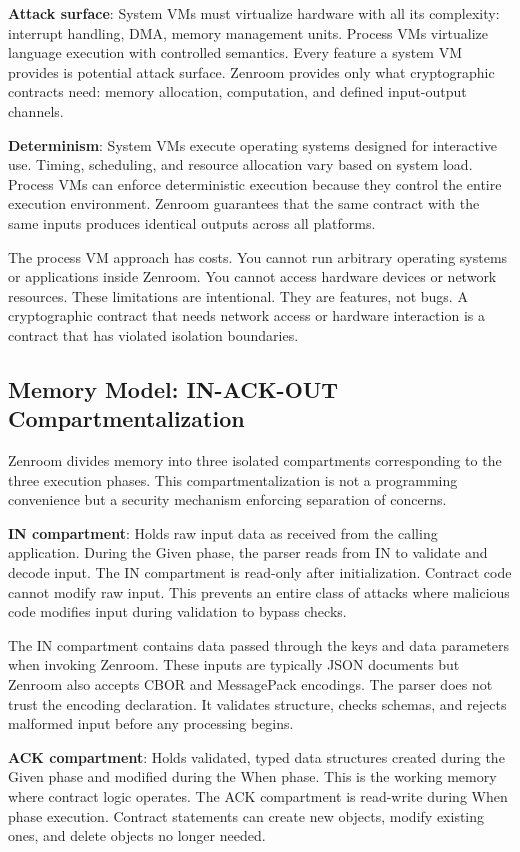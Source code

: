 \textbf{Attack surface}: System VMs must virtualize hardware with all
its complexity: interrupt handling, DMA, memory management
units. Process VMs virtualize language execution with controlled
semantics. Every feature a system VM provides is potential attack
surface. Zenroom provides only what cryptographic contracts need:
memory allocation, computation, and defined input-output channels.

\textbf{Determinism}: System VMs execute operating systems designed
for interactive use. Timing, scheduling, and resource allocation vary
based on system load. Process VMs can enforce deterministic execution
because they control the entire execution environment. Zenroom
guarantees that the same contract with the same inputs produces
identical outputs across all platforms.

The process VM approach has costs. You cannot run arbitrary operating
systems or applications inside Zenroom. You cannot access hardware
devices or network resources. These limitations are intentional. They
are features, not bugs. A cryptographic contract that needs network
access or hardware interaction is a contract that has violated
isolation boundaries.

\subsection{Memory Model: IN-ACK-OUT Compartmentalization}

Zenroom divides memory into three isolated compartments corresponding
to the three execution phases. This compartmentalization is not a
programming convenience but a security mechanism enforcing separation
of concerns.

\textbf{IN compartment}: Holds raw input data as received from the
calling application. During the Given phase, the parser reads from IN
to validate and decode input. The IN compartment is read-only after
initialization. Contract code cannot modify raw input. This prevents
an entire class of attacks where malicious code modifies input during
validation to bypass checks.

The IN compartment contains data passed through the keys and data
parameters when invoking Zenroom. These inputs are typically JSON
documents but Zenroom also accepts CBOR and MessagePack encodings. The
parser does not trust the encoding declaration. It validates
structure, checks schemas, and rejects malformed input before any
processing begins.

\textbf{ACK compartment}: Holds validated, typed data structures
created during the Given phase and modified during the When
phase. This is the working memory where contract logic operates. The
ACK compartment is read-write during When phase execution. Contract
statements can create new objects, modify existing ones, and delete
objects no longer needed.

